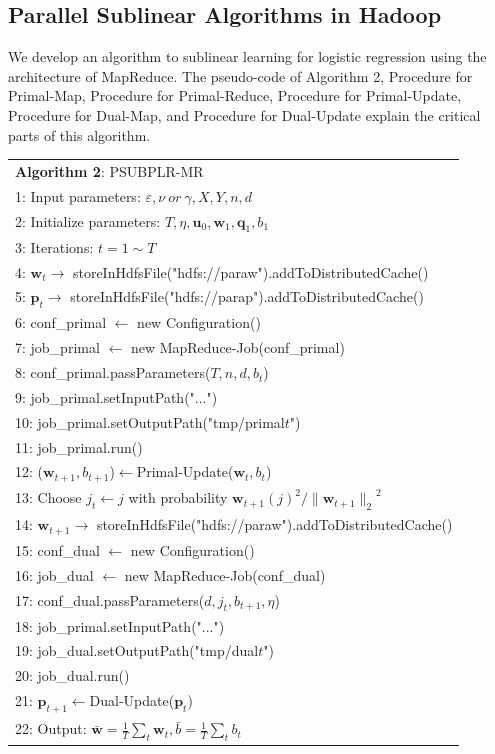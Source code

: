 \documentclass[10pt, conference, compsocconf]{IEEEtran}
\newcommand{\bw}{\mathbf{w}}
\newcommand{\bp}{\mathbf{p}}
\newcommand{\bq}{\mathbf{q}}
\newcommand{\lc}{\left(}
\newcommand{\rc}{\right)}
\newcommand{\lj}{\lc j\rc}
\newcommand{\tspace}{\hspace*{2em}}
\newcommand{\tspaces}{\hspace*{1.5em}}
\begin{document}
\subsection{Parallel Sublinear Algorithms in Hadoop}
We develop an algorithm to sublinear learning for logistic regression using the architecture of MapReduce.
The pseudo-code of Algorithm 2, Procedure for Primal-Map, Procedure for Primal-Reduce, Procedure for Primal-Update, Procedure for Dual-Map, and Procedure for Dual-Update explain the critical parts of this algorithm.
	\begin{table}[ht]
	\begin{tabular}{l}
	\hline\noalign{\smallskip}
	\textbf{Algorithm 2}: PSUBPLR-MR \\
	\noalign{\smallskip}
	\hline
	\noalign{\smallskip}
    1:  Input parameters: $\varepsilon, \nu~or~\gamma, X, Y, n, d$ \\
    2:	Initialize parameters: $T, \eta, {\mathbf{u}}_{0}, {\bw}_{1}, {\mathbf{\bq}}_{1}, {b}_{1}$\\
    3:	Iterations: $t=1 \sim T$ \\
    4:  \tspace $\bw_t \rightarrow$ storeInHdfsFile("hdfs://paraw").addToDistributedCache() \\
    5:  \tspace $\bp_t \rightarrow$ storeInHdfsFile("hdfs://parap").addToDistributedCache() \\
    6:  \tspace conf\_primal $\leftarrow$ new Configuration() \\
    7:  \tspace job\_primal $\leftarrow$ new MapReduce-Job(conf\_primal) \\
    8:  \tspace conf\_primal.passParameters($T, n, d, b_t$) \\
    9:  \tspace job\_primal.setInputPath("...") \\
	10:	\tspaces job\_primal.setOutputPath("tmp/primal$t$") \\
    11: \tspaces job\_primal.run() \\
    12: \tspaces ($\bw_{t+1}, b_{t+1}$)$\leftarrow$Primal-Update($\bw_t, b_t$) \\
    13: \tspaces Choose $j_t \leftarrow j$ with probability ${{\bw}_{t+1}\lj}^{2}/{\|{\bw}_{t+1}\|_2}^{2} $ \\
    14: \tspaces $\bw_{t+1} \rightarrow$ storeInHdfsFile("hdfs://paraw").addToDistributedCache() \\
    15: \tspaces conf\_dual $\leftarrow$ new Configuration() \\
    16: \tspaces job\_dual $\leftarrow$ new MapReduce-Job(conf\_dual) \\
    17: \tspaces conf\_dual.passParameters($d, j_t, b_{t+1}, \eta$) \\
    18: \tspaces job\_primal.setInputPath("...") \\	
    19:	\tspaces job\_dual.setOutputPath("tmp/dual$t$") \\
    20: \tspaces job\_dual.run() \\	
    21: \tspaces $\bp_{t+1}$$\leftarrow$Dual-Update($\bp_t$) \\
    22: Output: $\bar{\bw}=\frac{1}{T}\sum_{t}{\bw}_{t},\bar{b}=\frac{1}{T}\sum_{t}{b}_{t}$ \\
	\hline
	\end{tabular}
	\end{table}
\end{document}
